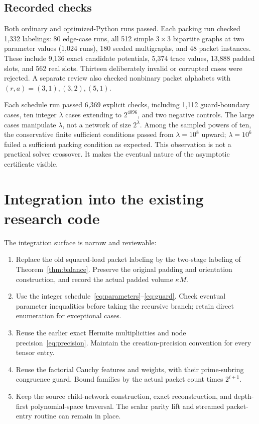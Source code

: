\documentclass[11pt,letterpaper]{article}
\numberwithin{equation}{section}
\theoremstyle{definition}\newtheorem{definition}[theorem]{Definition}
\theoremstyle{remark}\newtheorem{remark}[theorem]{Remark}
\begin{document}
\subsection{Recorded checks}

Both ordinary and optimized-Python runs passed. Each packing run checked 1,332 labelings: 80 edge-case runs, all 512 simple $3\times3$ bipartite graphs at two parameter values (1,024 runs), 180 seeded multigraphs, and 48 packet instances. These include 9,136 exact candidate potentials, 5,374 trace values, 13,888 padded slots, and 562 real slots. Thirteen deliberately invalid or corrupted cases were rejected. A separate review also checked nonbinary packet alphabets with $(r,a)=(3,1),(3,2),(5,1)$.

Each schedule run passed 6,369 explicit checks, including 1,112 guard-boundary cases, ten integer $\lambda$ cases extending to $2^{4096}$, and two negative controls. The large cases manipulate $\lambda$, not a network of size $2^\lambda$. Among the sampled powers of ten, the conservative finite sufficient conditions passed from $\lambda=10^8$ upward; $\lambda=10^6$ failed a sufficient packing condition as expected. This observation is not a practical solver crossover. It makes the eventual nature of the asymptotic certificate visible.

\section{Integration into the existing research code}
\label{sec:integration}

The integration surface is narrow and reviewable:
\begin{enumerate}
\item Replace the old squared-load packet labeling by the two-stage labeling of Theorem~\ref{thm:balance}. Preserve the original padding and orientation construction, and record the actual padded volume $\kappa M$.
\item Use the integer schedule~\eqref{eq:parameters}--\eqref{eq:guard}. Check eventual parameter inequalities before taking the recursive branch; retain direct enumeration for exceptional cases.
\item Reuse the earlier exact Hermite multiplicities and node precision~\eqref{eq:precision}. Maintain the creation-precision convention for every tensor entry.
\item Reuse the factorial Cauchy features and weights, with their prime-subring congruence guard. Bound families by the actual packet count times $2^{i+1}$.
\item Keep the source child-network construction, exact reconstruction, and depth-first polynomial-space traversal. The scalar parity lift and streamed packet-entry routine can remain in place.
\end{enumerate}
\end{document}
